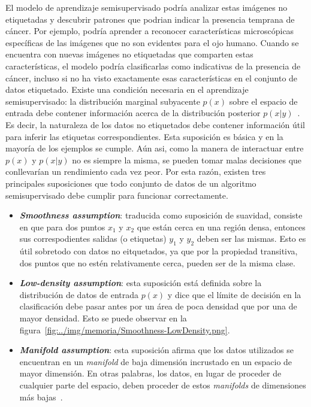 El modelo de aprendizaje semisupervisado podría analizar estas imágenes no etiquetadas y descubrir patrones que podrian indicar la presencia temprana de cáncer. Por ejemplo, podría aprender a reconocer características microscópicas específicas de las imágenes que no son evidentes para el ojo humano. Cuando se encuentra con nuevas imágenes no etiquetadas que comparten estas características, el modelo podría clasificarlas como indicativas de la presencia de cáncer, incluso si no ha visto exactamente esas características en el conjunto de datos etiquetado.
Existe una condición necesaria en el aprendizaje semisupervisado: la distribución marginal subyacente $p(x)$ sobre el espacio de entrada debe contener información acerca de la distribución posterior $p(x|y)$~\cite{Engelen:semi-supervised}. Es decir, la naturaleza de los datos no etiquetados debe contener información útil para inferir las etiquetas correspondientes.
Esta suposición es básica y en la mayoría de los ejemplos se cumple. Aún asi, como la manera de interactuar entre $p(x)$ y  $p(x|y)$ no es siempre la misma, se pueden tomar malas decisiones que conllevarían un rendimiento cada vez peor. Por esta razón, existen tres principales suposiciones que todo conjunto de datos de un algoritmo semisupervisado debe cumplir para funcionar correctamente.
\begin{itemize}
	\item \textit{\textbf{Smoothness assumption}}: traducida como suposición de suavidad, consiste en que para dos puntos $x_{1}$ y $x_{2}$ que están cerca en una región densa, entonces sus correspodientes salidas (o etiquetas) $y_{1}$ y $y_{2}$ deben ser las mismas. Esto es útil sobretodo con datos no eitquetados, ya que por la propiedad transitiva, dos puntos que no estén relativamente cerca, pueden ser de la misma clase.
	\item \textit{\textbf{Low-density assumption}}: esta suposición está definida sobre la distribución de datos de entrada $p(x)$ y dice que el límite de decisión en la clasificación debe pasar antes por un área de poca densidad que por una de mayor densidad. Esto se puede observar en la figura~\ref{fig:../img/memoria/Smoothness-LowDensity.png}.

	
	\item \textit{\textbf{Manifold assumption}}: esta suposición afirma que los datos utilizados se encuentran en un \textit{manifold} de baja dimensión incrustado en un espacio de mayor dimensión. En otras palabras, los datos, en lugar de proceder de cualquier parte del espacio, deben proceder de estos \textit{manifolds} de dimensiones más bajas~\cite{web:assumptions}.
\end{itemize}

